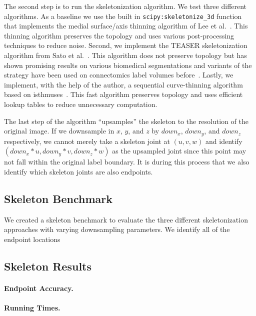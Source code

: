 The second step is to run the skeletonization algorithm.
We test three different algorithms.
As a baseline we use the built in \texttt{scipy:skeletonize\_3d} function that implements the medial surface/axis thinning algorithm of Lee et al.~\cite{lee1994building}.
This thinning algorithm preserves the topology and uses various post-processing techniques to reduce noise.
Second, we implement the TEASER skeletonization algorithm from Sato et al.~\cite{sato2000teasar}. 
This algorithm does not preserve topology but has shown promising results on various biomedical segmentations and variants of the strategy have been used on connectomics label volumes before~\cite{konstantin2018efficient,zhao2014automatic}.
Lastly, we implement, with the help of the author, a sequential curve-thinning algorithm based on isthmuses~\cite{palagyi2014sequential}.
This fast algorithm preserves topology and uses efficient lookup tables to reduce unnecessary computation.

The last step of the algorithm ``upsamples'' the skeleton to the resolution of the original image.
If we downsample in $x$, $y$, and $z$ by $down_x$, $down_y$, and $down_z$ respectively, we cannot merely take a skeleton joint at $(u, v, w)$ and identify $(down_x * u, down_y * v, down_z * w)$ as the upsampled joint since this point may not fall within the original label boundary.
It is during this process that we also identify which skeleton joints are also endpoints.


\subsection{Skeleton Benchmark}

We created a skeleton benchmark to evaluate the three different skeletonization approaches with varying downsampling parameters.
We identify all of the endpoint locations


\subsection{Skeleton Results}
\label{skeleton-results}

\paragraph{Endpoint Accuracy.}

\paragraph{Running Times.}




